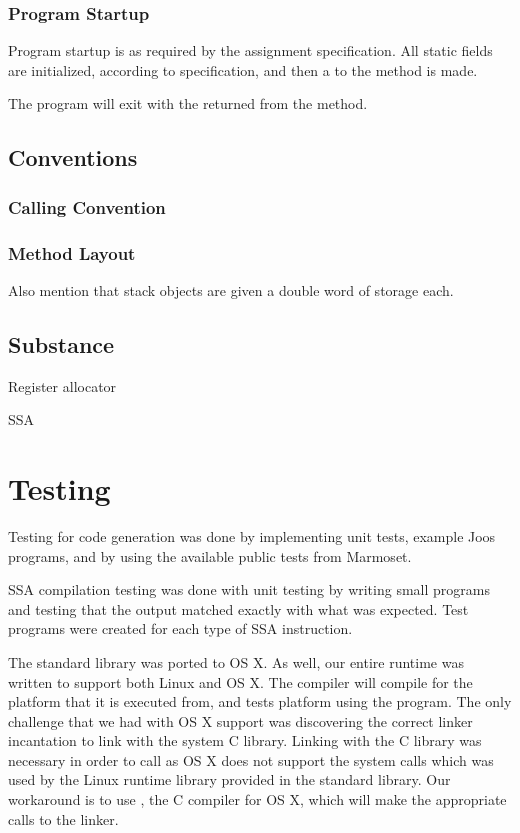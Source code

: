 \documentclass[pdftex,11pt,a4paper]{article}
\begin{document}
\subsubsection{Program Startup}

Program startup is as required by the assignment specification. All
static fields are initialized, according to specification, and then a
 to the  method is made.

The program will exit with the  returned from the
 method.

\subsection{Conventions}

\subsubsection{Calling Convention}

\subsubsection{Method Layout}

Also mention that stack objects are given a double word of storage each.


\subsection{Substance}

Register allocator

SSA


\section{Testing}

Testing for code generation was done by implementing unit tests,
example Joos programs, and by using the available public tests from
Marmoset.

SSA compilation testing was done with unit testing by writing small
programs and testing that the output matched exactly with what was
expected. Test programs were created for each type of SSA
instruction.

The standard library  was ported to OS X. As well, our
entire runtime was written to support both  Linux and  OS
X. The compiler will compile for the platform that it is executed
from, and tests platform using the  program. The only
challenge that we had with OS X support was discovering the correct
linker incantation to link with the system C library. Linking with the
C library was necessary in order to call  as OS X does not
support the system calls which was used by the Linux runtime library
provided in the standard library. Our workaround is to use
, the C compiler for OS X, which will make the appropriate
calls to the linker.
\end{document}
